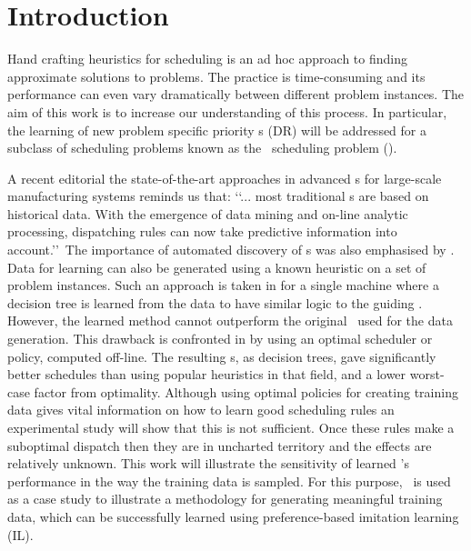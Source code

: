 \documentclass[twocolumn]{svjour3}
\begin{document}

\section{Introduction}\label{sec:introduction}

Hand crafting heuristics for scheduling is an ad hoc approach to finding 
approximate solutions to problems. The practice is time-consuming and its 
performance can even vary dramatically between different problem instances. The 
aim of this work is to increase our understanding of this process. In 
particular, the learning of new problem specific priority \dr s (DR) will be 
addressed for a subclass of scheduling problems known as the \jsp\ scheduling 
problem (\JSP). 

A recent editorial the state-of-the-art approaches \cite{Chen13} in advanced 
\dr s for large-scale manufacturing systems reminds us that:
\lq\lq ... most traditional \dr s are based on historical data. 
With the emergence of data mining and on-line analytic processing, dispatching 
rules can now take predictive information into account.\rq\rq~The importance of 
automated discovery of \dr s was also emphasised by \cite{Monch13}. 
Data for learning can also be generated using a known heuristic on a set of 
problem instances.
Such an approach is taken in \cite{Siggi05} for a single machine where
a decision tree is learned from the data to have similar logic to the guiding 
\dr. 
However, the learned method cannot outperform the original \dr\ used for the 
data generation. 
This drawback is confronted in \cite{Malik08,Russell09,Siggi10} by using an 
optimal scheduler or policy, computed off-line. The 
resulting \dr s, as decision trees, gave significantly better schedules than 
using popular heuristics in that field, and a lower worst-case factor from 
optimality. 
Although using optimal policies for creating training data gives vital 
information on how to learn good scheduling rules an experimental study will 
show that this is not sufficient. 
Once these rules make a suboptimal dispatch then they are in uncharted 
territory and the effects are relatively unknown. 
This work will illustrate the sensitivity of learned \dr's performance in the 
way the training data is sampled.
For this purpose, \JSP\ is used as a case study to illustrate a methodology for 
generating meaningful training data, which can be successfully 
learned using preference-based imitation learning (IL).
\end{document}
